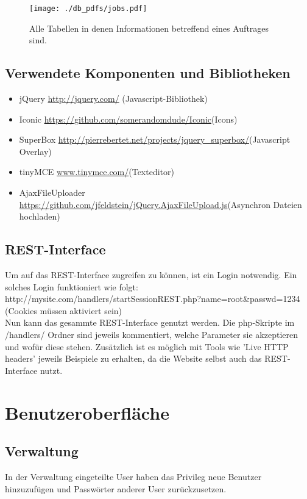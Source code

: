 \documentclass[ngerman, 12pt, pdftex]{scrartcl}[2006/07/30]
\begin{document}
\begin{figure}[h!p]
	\centering
	\texttt{[image: ./db\_pdfs/jobs.pdf]}
	\caption{Alle Tabellen in denen Informationen betreffend eines Auftrages sind.}
\end{figure}



\newpage

\subsection{Verwendete Komponenten und Bibliotheken} %
\begin{itemize}
\item jQuery \url{http://jquery.com/} (Javascript-Bibliothek)
\item Iconic \url{https://github.com/somerandomdude/Iconic}(Icons)
\item SuperBox \url{http://pierrebertet.net/projects/jquery_superbox/}(Javascript Overlay)
\item tinyMCE \url{www.tinymce.com/}(Texteditor)
\item AjaxFileUploader \url{https://github.com/jfeldstein/jQuery.AjaxFileUpload.js}(Asynchron Dateien hochladen)
\end{itemize}

\subsection{REST-Interface}
Um auf das REST-Interface zugreifen zu können, ist ein Login notwendig. Ein solches Login funktioniert wie folgt: \\ http://mysite.com/handlers/startSessionREST.php?name=root\&passwd=1234 \\
(Cookies müssen aktiviert sein) \\
Nun kann das gesammte REST-Interface genutzt werden. Die php-Skripte im /handlers/ Ordner  sind jeweils kommentiert, welche Parameter sie akzeptieren und wofür diese stehen. Zusätzlich ist es möglich mit Tools wie 'Live HTTP headers' jeweils Beispiele zu erhalten, da die Website selbst auch das REST-Interface nutzt.




\section{Benutzeroberfläche}
\subsection{Verwaltung}
In der Verwaltung eingeteilte User haben das Privileg neue Benutzer hinzuzufügen und Passwörter anderer User zurückzusetzen.
\end{document}
